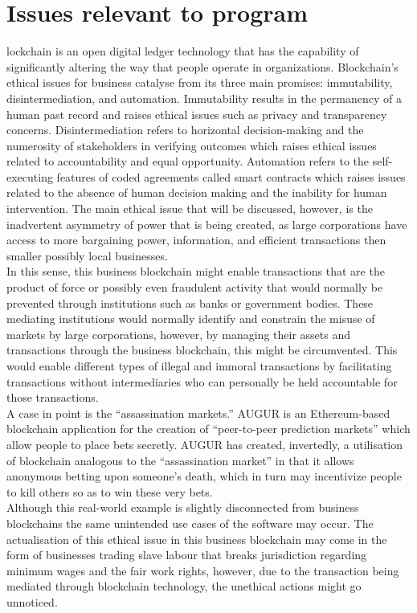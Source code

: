 
\let\textcircled=\pgftextcircled
\chapter{Issues relevant to program}

lockchain is an open digital ledger technology that has the capability of significantly altering the way that people operate in organizations. Blockchain’s ethical issues for business catalyse from its three main promises: immutability, disintermediation, and automation. Immutability results in the permanency of a human past record and raises ethical issues such as privacy and transparency concerns. Disintermediation refers to horizontal decision-making and the numerosity of stakeholders in verifying outcomes which raises ethical issues related to accountability and equal opportunity. Automation refers to the self-executing features of coded agreements called smart contracts which raises issues related to the absence of human decision making and the inability for human intervention. The main ethical issue that will be discussed, however, is the inadvertent asymmetry of power that is being created, as large corporations have access to more bargaining power, information, and efficient transactions then smaller possibly local businesses. \\

In this sense, this business blockchain might enable transactions that are the product of force or possibly even fraudulent activity that would normally be prevented through institutions such as banks or government bodies. These mediating institutions would normally identify and constrain the misuse of markets by large corporations, however, by managing their assets and transactions through the business blockchain, this might be circumvented. This would enable different types of illegal and immoral transactions by facilitating transactions without intermediaries who can personally be held accountable for those transactions. \\

A case in point is the “assassination markets.” AUGUR is an Ethereum-based blockchain application for the creation of “peer-to-peer prediction markets” which allow people to place bets secretly. AUGUR has created, invertedly, a utilisation of blockchain analogous to the “assassination market” in that it allows anonymous betting upon someone's death, which in turn may incentivize people to kill others so as to win these very bets. \\

Although this real-world example is slightly disconnected from business blockchains the same unintended use cases of the software may occur. The actualisation of this ethical issue in this business blockchain may come in the form of businesses trading slave labour that breaks jurisdiction regarding minimum wages and the fair work rights, however, due to the transaction being mediated through blockchain technology, the unethical actions might go unnoticed.
